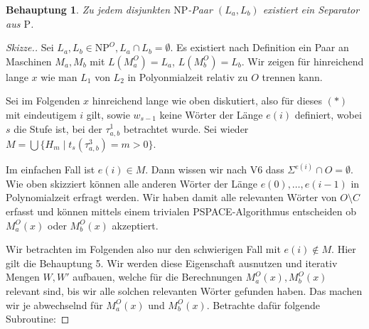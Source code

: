 \documentclass[nofonts]{uebung}
\newtheorem{claim}[theorem]{Behauptung}
\def\P{\ensuremath{\mathrm{P}}}
\def\NP{\ensuremath{\mathrm{NP}}}
\begin{document}
\begin{claim}
    Zu jedem disjunkten \NP-Paar $(L_a, L_b)$ existiert ein Separator aus $\P$.
\end{claim}
\begin{proof}[Skizze.]
    Sei $L_a, L_b\in\NP^O, L_a\cap L_b=\emptyset$. Es existiert nach Definition ein Paar an Maschinen $M_a, M_b$ mit $L(M_a^O)=L_a$, $L(M_b^O)=L_b$.
    Wir zeigen für hinreichend lange $x$ wie man $L_1$ von $L_2$ in Polyonmialzeit relativ zu $O$ trennen kann.
    
    Sei im Folgenden $x$ hinreichend lange wie oben diskutiert, also für dieses $(\ast)$ mit eindeutigem $i$ gilt, sowie $w_{s-1}$ keine Wörter der Länge $e(i)$ definiert, wobei $s$ die Stufe ist, bei der $\tau^1_{a,b}$ betrachtet wurde.
    Sei wieder $M=\bigcup \{ H_m \mid t_s(\tau^3_{a,b})=m>0 \}$.

    Im einfachen Fall ist $e(i)\in M$. Dann wissen wir nach V6 dass $\Sigma^{e(i)}\cap O=\emptyset$.
    Wie oben skizziert können alle anderen Wörter der Länge $e(0),\dots, e(i-1)$ in Polynomialzeit erfragt werden.
    Wir haben damit alle relevanten Wörter von $O\setminus C$ erfasst und können mittels einem trivialen PSPACE-Algorithmus entscheiden ob $M_a^O(x)$ oder $M_b^O(x)$ akzeptiert.
    
    Wir betrachten im Folgenden also nur den schwierigen Fall mit $e(i)\not\in M$.
    Hier gilt die Behauptung 5.
    Wir werden diese Eigenschaft ausnutzen und iterativ Mengen $W, W'$ aufbauen, welche für die Berechnungen $M_a^O(x), M_b^O(x)$ relevant sind, bis wir alle solchen relevanten Wörter gefunden haben.
    Das machen wir je abwechselnd für $M_a^O(x)$ und $M_b^O(x)$.
    Betrachte dafür folgende Subroutine:


\end{proof}
\end{document}
